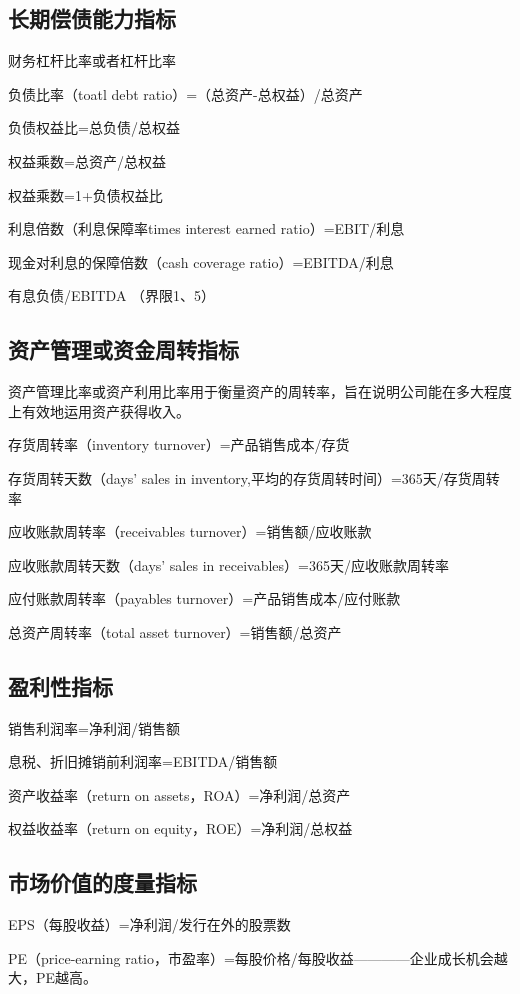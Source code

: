 \documentclass{article}
\begin{document}
\subsection{长期偿债能力指标}
财务杠杆比率或者杠杆比率

负债比率（toatl debt ratio）=（总资产-总权益）/总资产

负债权益比=总负债/总权益

权益乘数=总资产/总权益

权益乘数=1+负债权益比

利息倍数（利息保障率times interest earned ratio）=EBIT/利息

现金对利息的保障倍数（cash coverage ratio）=EBITDA/利息	

有息负债/EBITDA （界限1、5）

\subsection{资产管理或资金周转指标}
资产管理比率或资产利用比率用于衡量资产的周转率，旨在说明公司能在多大程度上有效地运用资产获得收入。

存货周转率（inventory turnover）=产品销售成本/存货

存货周转天数（days' sales in inventory,平均的存货周转时间）=365天/存货周转率

应收账款周转率（receivables turnover）=销售额/应收账款

应收账款周转天数（days' sales in receivables）=365天/应收账款周转率

应付账款周转率（payables turnover）=产品销售成本/应付账款

总资产周转率（total asset turnover）=销售额/总资产

\subsection{盈利性指标}
销售利润率=净利润/销售额

息税、折旧摊销前利润率=EBITDA/销售额

资产收益率（return on assets，ROA）=净利润/总资产

权益收益率（return on equity，ROE）=净利润/总权益

\subsection{市场价值的度量指标}
EPS（每股收益）=净利润/发行在外的股票数

PE（price-earning ratio，市盈率）=每股价格/每股收益————企业成长机会越大，PE越高。
\end{document}
